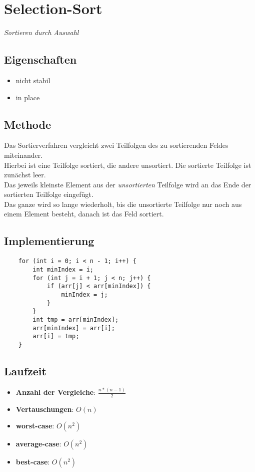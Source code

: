 \section{Selection-Sort}

\textit{Sortieren durch Auswahl}

\subsection{Eigenschaften}
\begin{itemize}
    \item nicht stabil
    \item in place
\end{itemize}

\subsection{Methode}
Das Sortierverfahren vergleicht zwei Teilfolgen des zu sortierenden Feldes miteinander.\\
Hierbei ist eine Teilfolge sortiert, die andere unsortiert.
Die sortierte Teilfolge ist zunächst leer.\\
Das jeweils kleinste Element aus der \textit{unsortierten} Teilfolge wird an das Ende der sortierten Teilfolge eingefügt.\\
Das ganze wird so lange wiederholt, bis die unsortierte Teilfolge nur noch aus einem Element besteht, danach ist das Feld sortiert.



\subsection{Implementierung}
\begin{verbatim}
    for (int i = 0; i < n - 1; i++) {
        int minIndex = i;
        for (int j = i + 1; j < n; j++) {
            if (arr[j] < arr[minIndex]) {
                minIndex = j;
            }
        }
        int tmp = arr[minIndex];
        arr[minIndex] = arr[i];
        arr[i] = tmp;
    }
\end{verbatim}


\subsection{Laufzeit}
\begin{itemize}
    \item \textbf{Anzahl der Vergleiche}: $\frac{n * ( n - 1)}{2}$
    \item \textbf{Vertauschungen}: $O(n)$
    \item \textbf{worst-case}: $O(n^2)$
    \item \textbf{average-case}: $O(n^2)$
    \item \textbf{best-case}: $O(n^2)$
\end{itemize}